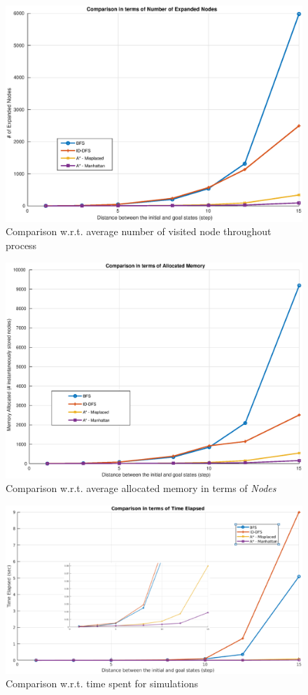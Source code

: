 \documentclass[12pt]{article}
\begin{document}
\begin{enumerate}
	\begin{figure}[htb]
		\centering
		\includegraphics[width=.9\columnwidth]{images/Q8_numVisitedNodes.eps}
		\caption{Comparison w.r.t. average number of visited node throughout process}
		\label{fig:MCvisited}
	\end{figure}

	\begin{figure}[htb]
		\centering
		\includegraphics[width=.9\columnwidth]{images/Q8_allocatedMemory.eps}
		\caption{Comparison w.r.t. average allocated memory in terms of \textit{Nodes}}
		\label{fig:MCallocated}
	\end{figure}

	\begin{figure}[htb]
		\centering
		\includegraphics[width=.8\columnwidth]{images/Q8_timeElapsed.eps}
		\caption{Comparison w.r.t. time spent for simulations}
		\label{fig:MCtime}
	\end{figure}			 
			

\end{enumerate}
\end{document}
